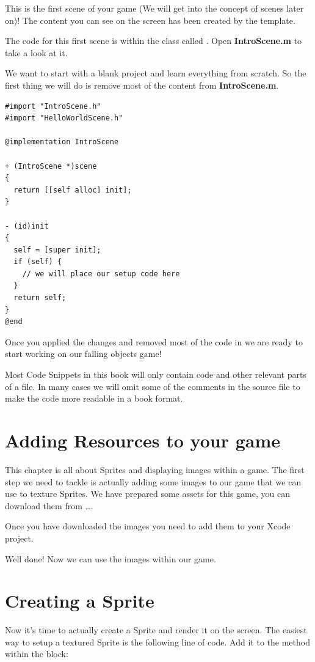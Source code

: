 This is the first scene of your game (We will get into the concept of scenes
later on)! The content you can see on the screen has been created by the
\cocos{} template.

The code for this first scene is within the class called
. Open \textbf{IntroScene.m} to take a look at it.

We want to start with a blank project and learn everything from scratch. So the
first thing we will do is remove most of the content from \textbf{IntroScene.m}.
 
\begin{lstlisting}[title=IntroScene.m]
#import "IntroScene.h"
#import "HelloWorldScene.h" 

@implementation IntroScene

+ (IntroScene *)scene
{
  return [[self alloc] init];
}

- (id)init
{
  self = [super init];  
  if (self) {
    // we will place our setup code here
  }
  return self;
}
@end
\end{lstlisting}

Once you applied the changes and removed most of the code in
 we are ready to start working on our falling objects
game!

\begin{lamp}[frametitle={About Code Snippets}]
Most Code Snippets in this book will only contain code and other relevant parts
of a file. In many cases we will omit some of the comments in the source file to
make the code more readable in a book format.
\end{lamp}

\section{Adding Resources to your game}
This chapter is all about Sprites and displaying images within a game. The first step we need to tackle is actually adding
some images to our game that we can use to texture Sprites. We have prepared some
assets for this game, you can download them from \ldots. 

Once you have downloaded the images you need to add them to your Xcode project.

Well done! Now we can use the images within our game.

\section{Creating a Sprite}
Now it's time to actually create a Sprite and render it on the screen. 
The easiest way to setup a textured Sprite is the following line of
code. Add it to the  method within the  block:

